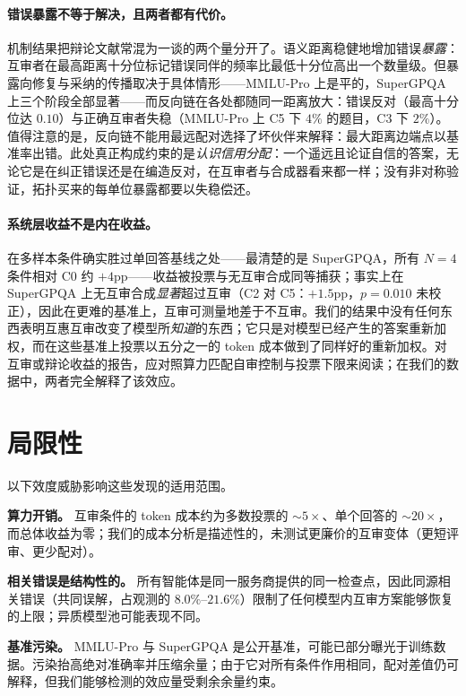 \documentclass[UTF8,11pt]{ctexart}
\begin{document}
\paragraph{错误暴露不等于解决，且两者都有代价。}
机制结果把辩论文献常混为一谈的两个量分开了。语义距离稳健地增加错误\emph{暴露}：互审者在最高距离十分位标记错误同伴的频率比最低十分位高出一个数量级。但暴露向修复与采纳的传播取决于具体情形——MMLU-Pro 上是平的，SuperGPQA 上三个阶段全部显著——而反向链在各处都随同一距离放大：错误反对（最高十分位达 $0.10$）与正确互审者失稳（MMLU-Pro 上 C5 下 $4\%$ 的题目，C3 下 $2\%$）。值得注意的是，反向链不能用最远配对选择了坏伙伴来解释：最大距离边端点以基准率出错。此处真正构成约束的是\emph{认识信用分配}：一个遥远且论证自信的答案，无论它是在纠正错误还是在编造反对，在互审者与合成器看来都一样；没有非对称验证，拓扑买来的每单位暴露都要以失稳偿还。

\paragraph{系统层收益不是内在收益。}
在多样本条件确实胜过单回答基线之处——最清楚的是 SuperGPQA，所有 $N{=}4$ 条件相对 C0 约 $+4$pp——收益被投票与无互审合成同等捕获；事实上在 SuperGPQA 上无互审合成\emph{显著}超过互审（C2 对 C5：$+1.5$pp，$p=0.010$ 未校正），因此在更难的基准上，互审可测量地差于不互审。我们的结果中没有任何东西表明互惠互审改变了模型所\emph{知道}的东西；它只是对模型已经产生的答案重新加权，而在这些基准上投票以五分之一的 token 成本做到了同样好的重新加权。对互审或辩论收益的报告，应对照算力匹配自审控制与投票下限来阅读；在我们的数据中，两者完全解释了该效应。

\section{局限性}
\label{sec:limitations}

以下效度威胁影响这些发现的适用范围。

\textbf{算力开销。} 互审条件的 token 成本约为多数投票的 ${\sim}5\times$、单个回答的 ${\sim}20\times$，而总体收益为零；我们的成本分析是描述性的，未测试更廉价的互审变体（更短评审、更少配对）。

\textbf{相关错误是结构性的。} 所有智能体是同一服务商提供的同一检查点，因此同源相关错误（共同误解，占观测的 $8.0\%$--$21.6\%$）限制了任何模型内互审方案能够恢复的上限；异质模型池可能表现不同。

\textbf{基准污染。} MMLU-Pro 与 SuperGPQA 是公开基准，可能已部分曝光于训练数据。污染抬高绝对准确率并压缩余量；由于它对所有条件作用相同，配对差值仍可解释，但我们能够检测的效应量受剩余余量约束。
\end{document}
